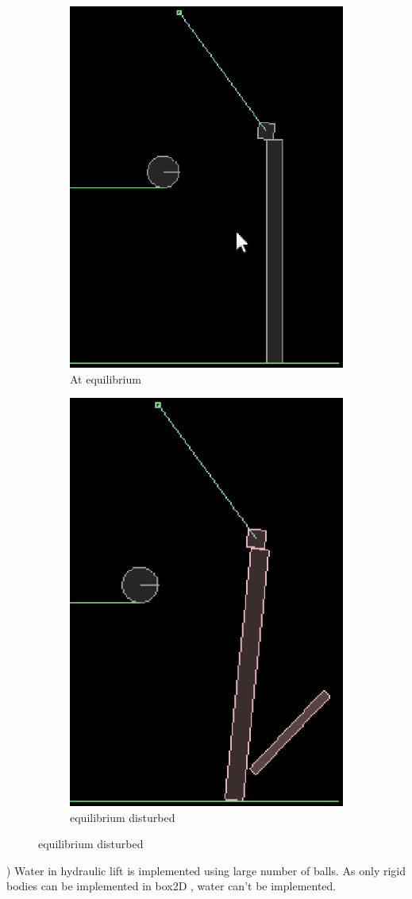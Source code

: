 \documentclass[a4paper,11pt]{article}
\begin{document}
{\begin{figure}[h]
\centering
\begin{subfigure}{.5\textwidth}
  \centering
  \includegraphics[width=.4\linewidth]{image7}
  \caption{At equilibrium}
  \label{fig:image7}
\end{subfigure}%
\begin{subfigure}{.5\textwidth}
  \centering
  \includegraphics[width=.4\linewidth]{image8}
  \caption{equilibrium disturbed}
  \label{fig:image8}
\end{subfigure}
\end{figure}

) Water in hydraulic lift is implemented using large number of balls. As only rigid bodies can be implemented in box2D , water can't be implemented. \\

}
\end{document}
